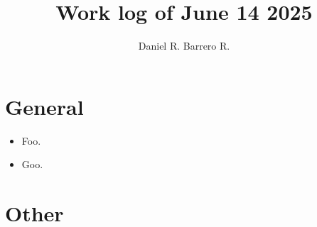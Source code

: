 \documentclass{amsart}
\title{Work log of June 14 2025}
\author{Daniel R. Barrero R.}
\begin{document}
\maketitle

\section{General}

\begin{itemize}
	\item Foo.
	\item Goo.
\end{itemize}

\section{Other}
\end{document}
